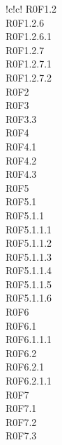\begin{tabella}{!{\VRule}c!{\VRule}c!{\VRule}}
{				R0F1.2 \\
				R0F1.2.6 \\
				R0F1.2.6.1 \\
				R0F1.2.7 \\
				R0F1.2.7.1 \\
				R0F1.2.7.2 \\
				R0F2 \\
				R0F3 \\
				R0F3.3 \\
				R0F4 \\
				R0F4.1 \\
				R0F4.2 \\
				R0F4.3 \\
				R0F5 \\
				R0F5.1 \\
				R0F5.1.1 \\
				R0F5.1.1.1 \\
				R0F5.1.1.2 \\
				R0F5.1.1.3 \\
				R0F5.1.1.4 \\
				R0F5.1.1.5 \\
				R0F5.1.1.6 \\
				R0F6 \\
				R0F6.1 \\
				R0F6.1.1.1 \\
				R0F6.2 \\
				R0F6.2.1 \\
				R0F6.2.1.1 \\
				R0F7 \\
				R0F7.1 \\
				R0F7.2 \\
				R0F7.3 \\
			}\\ 
			

\end{tabella}
